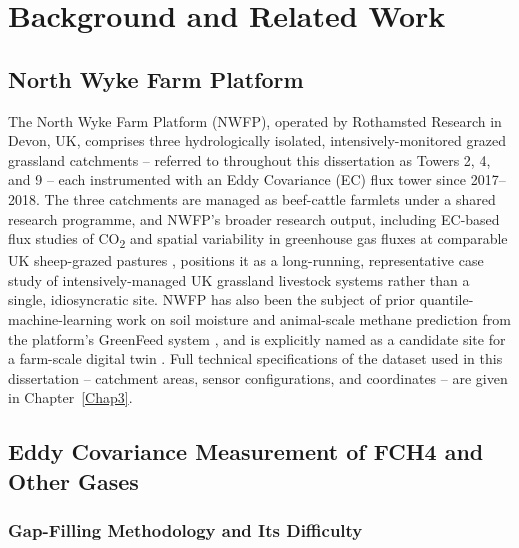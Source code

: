 \chapter{Background and Related Work} \label{Chap2}

\section{North Wyke Farm Platform}

The North Wyke Farm Platform (NWFP), operated by Rothamsted Research in Devon, UK, comprises three
hydrologically isolated, intensively-monitored grazed grassland catchments -- referred to
throughout this dissertation as Towers 2, 4, and 9 -- each instrumented with an Eddy Covariance
(EC) flux tower since 2017--2018. The three catchments are managed as beef-cattle farmlets under a
shared research programme, and NWFP's broader research output, including EC-based flux studies of
CO\textsubscript{2} \cite{cardenas2022} and spatial variability in greenhouse gas fluxes at
comparable UK sheep-grazed pastures \cite{charteris2021spatial}, positions it as a long-running,
representative case study of intensively-managed UK grassland livestock systems rather than a
single, idiosyncratic site. NWFP has also been the subject of prior quantile-machine-learning work
on soil moisture \cite{oulaid2025} and animal-scale methane prediction from the platform's GreenFeed
system \cite{partridge2024}, and is explicitly named as a candidate site for a farm-scale digital
twin \cite{fakeye2024}. Full technical specifications of the dataset used in this dissertation --
catchment areas, sensor configurations, and coordinates -- are given in Chapter~\ref{Chap3}.

\section{Eddy Covariance Measurement of FCH4 and Other Gases}

\subsection{Gap-Filling Methodology and Its Difficulty}

